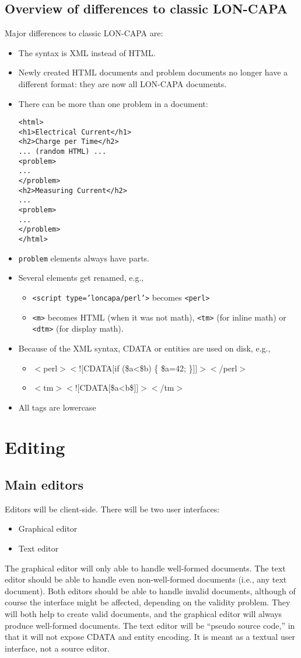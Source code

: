 \subsection{Overview of differences to classic LON-CAPA}
Major differences to classic LON-CAPA are:
\begin{itemize}
\item The syntax is XML instead of HTML.
\item Newly created HTML documents and problem documents no longer have a different format: they are now all LON-CAPA documents.
\item There can be more than one problem in a document:
\begin{verbatim}
<html>
<h1>Electrical Current</h1>
<h2>Charge per Time</h2>
... (random HTML) ...
<problem>
...
</problem>
<h2>Measuring Current</h2>
...
<problem>
...
</problem>
</html>
\end{verbatim}
\item \texttt{problem} elements always have parts.
\item Several elements get renamed, e.g.,
\begin{itemize}
\item \texttt{<script type='loncapa/perl'>} becomes \texttt{<perl>}
\item \texttt{<m>} becomes HTML (when it was not math), \texttt{<tm>} (for inline math) or \texttt{<dtm>} (for display math).
\end{itemize}
\item Because of the XML syntax, CDATA or entities are used on disk, e.g.,
\begin{itemize}
\item $<$perl$><![$CDATA$[$if (\$a<\$b) \{ \$a=42; \}$]]><$/perl$>$
\item $<$tm$><![$CDATA$[$\$a<b\$$]]><$/tm$>$
\end{itemize}
\item All tags are lowercase
\end{itemize}

\section{Editing}
\subsection{Main editors}
Editors will be client-side. There will be two user interfaces:
\begin{itemize}
\item Graphical editor
\item Text editor
\end{itemize}
The graphical editor will only able to handle well-formed documents. The text editor should be able to handle even non-well-formed documents (i.e., any text document). Both editors should be able to handle invalid documents, although of course the interface might be affected, depending on the validity problem. They will both help to create valid documents, and the graphical editor will always produce well-formed documents.
The text editor will be ``pseudo source code,'' in that it will not expose CDATA and entity encoding. It is meant as a textual user interface, not a source editor.
